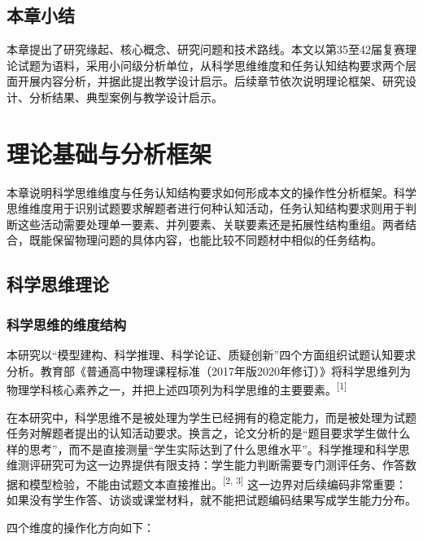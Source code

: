 \documentclass[
  12pt,
  a4paper,twoside,openany]{ctexbook}
\begin{document}
\section{本章小结}\label{ux672cux7ae0ux5c0fux7ed3}

\enlargethispage{2\baselineskip}

本章提出了研究缘起、核心概念、研究问题和技术路线。本文以第35至42届复赛理论试题为语料，采用小问级分析单位，从科学思维维度和任务认知结构要求两个层面开展内容分析，并据此提出教学设计启示。后续章节依次说明理论框架、研究设计、分析结果、典型案例与教学设计启示。

\chapter{理论基础与分析框架}\label{ux7406ux8bbaux57faux7840ux4e0eux5206ux6790ux6846ux67b6}

本章说明科学思维维度与任务认知结构要求如何形成本文的操作性分析框架。科学思维维度用于识别试题要求解题者进行何种认知活动，任务认知结构要求则用于判断这些活动需要处理单一要素、并列要素、关联要素还是拓展性结构重组。两者结合，既能保留物理问题的具体内容，也能比较不同题材中相似的任务结构。

\section{科学思维理论}\label{ux79d1ux5b66ux601dux7ef4ux7406ux8bba}

\subsection{科学思维的维度结构}\label{ux79d1ux5b66ux601dux7ef4ux7684ux7ef4ux5ea6ux7ed3ux6784}

本研究以``模型建构、科学推理、科学论证、质疑创新''四个方面组织试题认知要求分析。教育部《普通高中物理课程标准（2017年版2020年修订）》将科学思维列为物理学科核心素养之一，并把上述四项列为科学思维的主要要素。\textsuperscript{[1]}

在本研究中，科学思维不是被处理为学生已经拥有的稳定能力，而是被处理为试题任务对解题者提出的认知活动要求。换言之，论文分析的是``题目要求学生做什么样的思考''，而不是直接测量``学生实际达到了什么思维水平''。科学推理和科学思维测评研究可为这一边界提供有限支持：学生能力判断需要专门测评任务、作答数据和模型检验，不能由试题文本直接推出。\textsuperscript{[2, 3]}
这一边界对后续编码非常重要：如果没有学生作答、访谈或课堂材料，就不能把试题编码结果写成学生能力分布。

四个维度的操作化方向如下：
\end{document}
